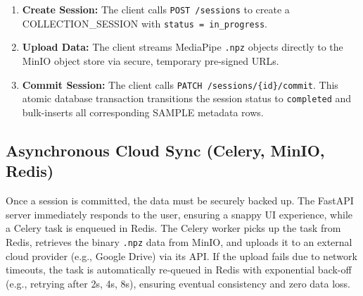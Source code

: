 
\begin{enumerate}
    \item \textbf{Create Session:} The client calls \texttt{POST /sessions} to create a COLLECTION\_SESSION with \texttt{status = in\_progress}.
    \item \textbf{Upload Data:} The client streams MediaPipe \texttt{.npz} objects directly to the MinIO object store via secure, temporary pre-signed URLs.
    \item \textbf{Commit Session:} The client calls \texttt{PATCH /sessions/\{id\}/commit}. This atomic database transaction transitions the session status to \texttt{completed} and bulk-inserts all corresponding SAMPLE metadata rows.
\end{enumerate}

\subsection{Asynchronous Cloud Sync (Celery, MinIO, Redis)}
Once a session is committed, the data must be securely backed up. The FastAPI server immediately responds to the user, ensuring a snappy UI experience, while a Celery task is enqueued in Redis. 
The Celery worker picks up the task from Redis, retrieves the binary \texttt{.npz} data from MinIO, and uploads it to an external cloud provider (e.g., Google Drive) via its API. If the upload fails due to network timeouts, the task is automatically re-queued in Redis with exponential back-off (e.g., retrying after 2s, 4s, 8s), ensuring eventual consistency and zero data loss.
